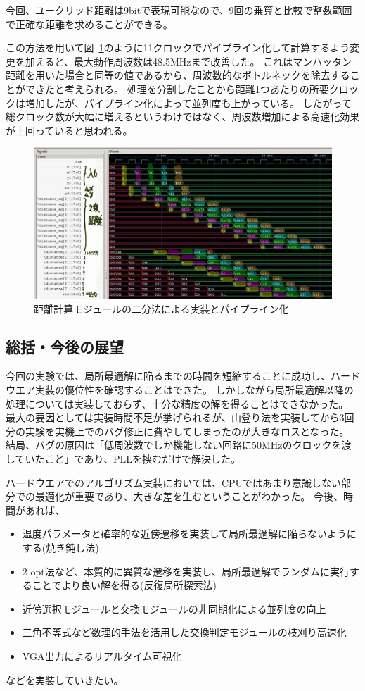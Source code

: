 今回、ユークリッド距離は9bitで表現可能なので、9回の乗算と比較で整数範囲で正確な距離を求めることができる。

この方法を用いて図~\ref{fig:distance_binary}のように11クロックでパイプライン化して計算するよう変更を加えると、最大動作周波数は48.5MHzまで改善した。
これはマンハッタン距離を用いた場合と同等の値であるから、周波数的なボトルネックを除去することができたと考えられる。
処理を分割したことから距離1つあたりの所要クロックは増加したが、パイプライン化によって並列度も上がっている。
したがって総クロック数が大幅に増えるというわけではなく、周波数増加による高速化効果が上回っていると思われる。

\begin{figure}
    \begin{center}
        \includegraphics[width=15cm]{figure/distance_binary.jpg}
        \caption{距離計算モジュールの二分法による実装とパイプライン化}\label{fig:distance_binary}
    \end{center}
\end{figure}

\subsection{総括・今後の展望}
今回の実験では、局所最適解に陥るまでの時間を短縮することに成功し、ハードウエア実装の優位性を確認することはできた。
しかしながら局所最適解以降の処理については実装しておらず、十分な精度の解を得ることはできなかった。
最大の要因としては実装時間不足が挙げられるが、山登り法を実装してから3回分の実験を実機上でのバグ修正に費やしてしまったのが大きなロスとなった。
結局、バグの原因は「低周波数でしか機能しない回路に50MHzのクロックを渡していたこと」であり、PLLを挟むだけで解決した。

ハードウエアでのアルゴリズム実装においては、CPUではあまり意識しない部分での最適化が重要であり、大きな差を生むということがわかった。
今後、時間があれば、
\begin{itemize}
    \item 温度パラメータと確率的な近傍遷移を実装して局所最適解に陥らないようにする(焼き鈍し法)
    \item 2-opt法など、本質的に異質な遷移を実装し、局所最適解でランダムに実行することでより良い解を得る(反復局所探索法)
    \item 近傍選択モジュールと交換モジュールの非同期化による並列度の向上
    \item 三角不等式など数理的手法を活用した交換判定モジュールの枝刈り高速化
    \item VGA出力によるリアルタイム可視化
\end{itemize}
などを実装していきたい。
